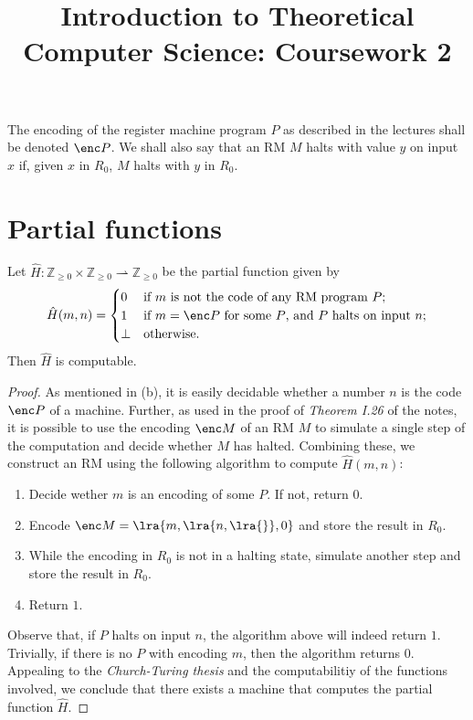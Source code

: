 \documentclass{article}
\title{Introduction to Theoretical Computer Science: Coursework 2}
\author{}
\begin{document}
\maketitle
\noindent The encoding of the register machine program $P$ as described in the lectures shall be denoted $\enc P$.
We shall also say that an RM $M$ halts with value $y$ on input $x$ if, given $x$ in $R_0$, $M$ halts
with $y$ in $R_0$.
\renewcommand{\N}{\mathbb{Z}_{\geq 0}}
\section{Partial functions}
\begin{claim*}[a, 1]
	Let $\hat H:\N\times\N\rightharpoonup\N$ be the partial function given by
	\begin{align*}
		\hat H(m,n)=\begin{cases}
			            0    & \text{if $m$ is not the code of any RM program $P$;}           \\
			            1    & \text{if $m=\enc P$ for some $P$, and $P$ halts on input $n$;} \\
			            \bot & \text{otherwise}.
		            \end{cases}
	\end{align*}
	Then $\hat H$ is computable.
	\begin{proof}
		As mentioned in (b), it is easily decidable whether a number $n$ is the code $\enc P$ of a
		machine. Further, as used in the proof of \emph{Theorem I.26} of the notes, it is possible
		to use the encoding $\enc M$ of an RM $M$ to simulate a single step of the computation and decide whether
		$M$ has halted. Combining these, we construct an RM using the following algorithm to compute
		$\hat H(m,n)$:
		\begin{enumerate}
			\item Decide wether $m$ is an encoding of some $P$. If not, return $0$.
			\item Encode $\enc M=\lra{m, \lra{n, \lra{}}, 0}$ and store the result in $R_0$.
			\item While the encoding in $R_0$ is not in a halting state, simulate another step and store the result in $R_0$.
			\item Return $1$.
		\end{enumerate}
		Observe that, if $P$ halts on input $n$, the algorithm above will indeed return $1$. Trivially,
		if there is no $P$ with encoding $m$, then the algorithm returns $0$.
		Appealing to the \emph{Church-Turing thesis} and the computabilitiy of the functions involved,
		we conclude that there exists a machine that computes the partial function $\hat H$.
	\end{proof}
\end{claim*}
\end{document}
